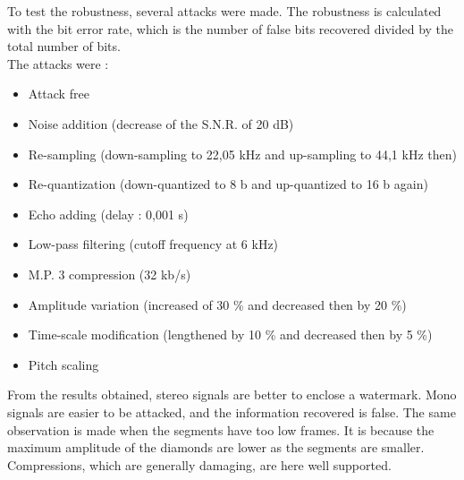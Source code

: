To test the robustness, several attacks were made. The robustness is calculated with the bit error rate, which is the number of false bits recovered divided by the total number of bits.\\
The attacks were :
\begin{itemize}
\item Attack free
\item Noise addition (decrease of the S.N.R. of 20 dB)
\item Re-sampling (down-sampling to 22,05 kHz and up-sampling to 44,1 kHz then)
\item Re-quantization (down-quantized to 8 b and up-quantized to 16 b again)
\item Echo adding (delay : 0,001 s)
\item Low-pass filtering (cutoff frequency at 6 kHz)
\item M.P. 3 compression (32 kb/s)
\item Amplitude variation (increased of 30 \% and decreased then by 20 \%)
\item Time-scale modification (lengthened by 10 \% and decreased then by 5 \%)
\item Pitch scaling
\end{itemize}

From the results obtained, stereo signals are better to enclose a watermark. Mono signals are easier to be attacked, and the information recovered is false. The same observation is made when the segments have too low frames. It is because the maximum amplitude of the diamonds are lower as the segments are smaller.\\
Compressions, which are generally damaging, are here well supported.
